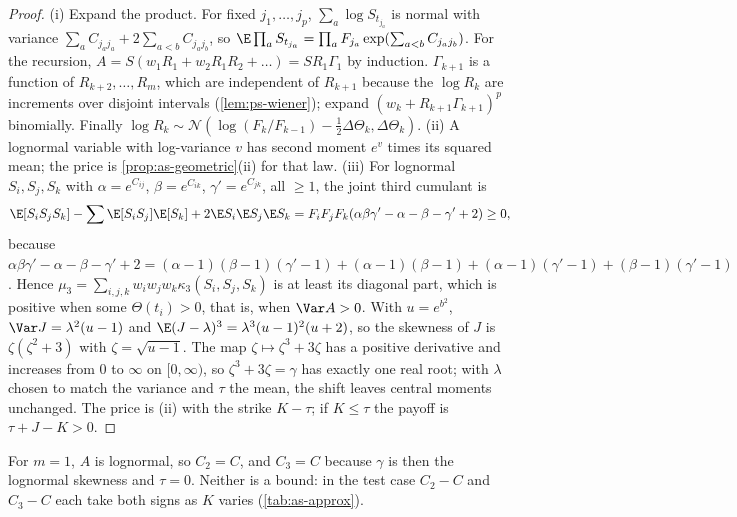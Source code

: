 \begin{proof}
(i) Expand the product. For fixed $j_1,\dots,j_p$, $\sum_a\log S_{t_{j_a}}$ is normal with
variance $\sum_aC_{j_aj_a}+2\sum_{a<b}C_{j_aj_b}$, so $\E\prod_aS_{t_{j_a}}=\prod_aF_{j_a}
\exp(\sum_{a<b}C_{j_aj_b})$. For the recursion,
$A=S(w_1R_1+w_2R_1R_2+\dots)=SR_1\Gamma_1$ by induction. $\Gamma_{k+1}$ is a function of
$R_{k+2},\dots,R_m$, which are independent of $R_{k+1}$ because the $\log R_k$ are increments
over disjoint intervals (\cref{lem:ps-wiener}); expand $(w_k+R_{k+1}\Gamma_{k+1})^p$
binomially. Finally
$\log R_k\sim\mathcal N(\log(F_k/F_{k-1})-\frac12\Delta\Theta_k,\Delta\Theta_k)$.
(ii) A lognormal variable with log-variance $v$ has second moment $e^v$ times its squared mean; the price is
\cref{prop:as-geometric}(ii) for that law. (iii) For lognormal $S_i,S_j,S_k$ with
$\alpha=e^{C_{ij}}$, $\beta=e^{C_{ik}}$, $\gamma'=e^{C_{jk}}$, all $\ge1$, the joint third cumulant is
\[
  \E[S_iS_jS_k]-\sum\E[S_iS_j]\E[S_k]+2\E S_i\E S_j\E S_k
  =F_iF_jF_k(\alpha\beta\gamma'-\alpha-\beta-\gamma'+2)\ge0,
\]
because $\alpha\beta\gamma'-\alpha-\beta-\gamma'+2=(\alpha-1)(\beta-1)(\gamma'-1)+(\alpha-1)(\beta-1)+(\alpha-1)(\gamma'-1)+(\beta-1)(\gamma'-1)$.
Hence $\mu_3=\sum_{i,j,k}w_iw_jw_k\kappa_3(S_i,S_j,S_k)$ is at least its diagonal part, which is
positive when some $\Theta(t_i)>0$, that is, when $\Var A>0$. With $u=e^{b^2}$,
$\Var J=\lambda^2(u-1)$ and $\E(J-\lambda)^3=\lambda^3(u-1)^2(u+2)$, so the skewness of $J$ is
$\zeta(\zeta^2+3)$ with $\zeta=\sqrt{u-1}$. The map $\zeta\mapsto\zeta^3+3\zeta$ has a positive
derivative and increases from $0$ to $\infty$ on $[0,\infty)$, so $\zeta^3+3\zeta=\gamma$ has
exactly one real root; with $\lambda$ chosen to match the variance and $\tau$ the mean, the shift
leaves central moments unchanged. The price is (ii) with the strike $K-\tau$; if $K\le\tau$ the
payoff is $\tau+J-K>0$.
\end{proof}

For $m=1$, $A$ is lognormal, so $C_2=C$, and $C_3=C$ because $\gamma$ is then the lognormal
skewness and $\tau=0$. Neither is a bound: in the test case $C_2-C$ and $C_3-C$ each take both
signs as $K$ varies (\cref{tab:as-approx}).

